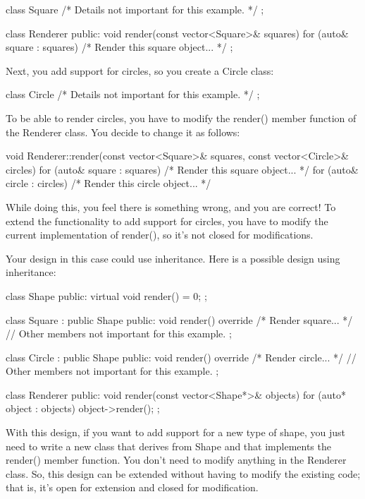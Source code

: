 \begin{cpp}
class Square { /* Details not important for this example. */ };

class Renderer
{
    public:
    void render(const vector<Square>& squares)
    {
        for (auto& square : squares) { /* Render this square object... */ }
    }
};
\end{cpp}

Next, you add support for circles, so you create a Circle class:

\begin{cpp}
class Circle { /* Details not important for this example. */ };
\end{cpp}

To be able to render circles, you have to modify the render() member function of the Renderer class. You decide to change it as follows:

\begin{cpp}
void Renderer::render(const vector<Square>& squares,
    const vector<Circle>& circles)
{
    for (auto& square : squares) { /* Render this square object... */ }
    for (auto& circle : circles) { /* Render this circle object... */ }
}
\end{cpp}

While doing this, you feel there is something wrong, and you are correct! To extend the functionality to add support for circles, you have to modify the current implementation of render(), so it’s not closed for modifications.

Your design in this case could use inheritance. Here is a possible design using inheritance:

\begin{cpp}
class Shape
{
    public:
    virtual void render() = 0;
};

class Square : public Shape
{
    public:
    void render() override { /* Render square... */ }
    // Other members not important for this example.
};

class Circle : public Shape
{
    public:
    void render() override { /* Render circle... */ }
    // Other members not important for this example.
};

class Renderer
{
    public:
    void render(const vector<Shape*>& objects)
    {
        for (auto* object : objects) { object->render(); }
    }
};
\end{cpp}

With this design, if you want to add support for a new type of shape, you just need to write a new class that derives from Shape and that implements the render() member function. You don’t need to modify anything in the Renderer class. So, this design can be extended without having to modify the existing code; that is, it’s open for extension and closed for modification.

